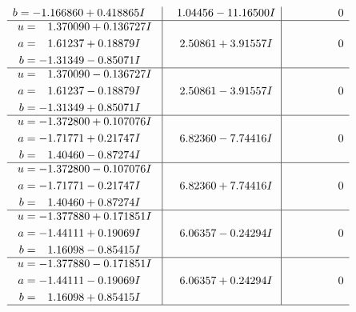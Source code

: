 \documentclass[1p]{elsarticle_modified}
\theoremstyle{definition}
\begin{document}
$$\begin{array}{c|c|c}
\begin{aligned}
b &= -1.166860 + 0.418865 I\end{aligned}
 & \phantom{-}1.04456 - 11.16500 I & \phantom{-0.000000 } 0 \\ \hline\begin{aligned}
u &= \phantom{-}1.370090 + 0.136727 I \\
a &= \phantom{-}1.61237 + 0.18879 I \\
b &= -1.31349 - 0.85071 I\end{aligned}
 & \phantom{-}2.50861 + 3.91557 I & \phantom{-0.000000 } 0 \\ \hline\begin{aligned}
u &= \phantom{-}1.370090 - 0.136727 I \\
a &= \phantom{-}1.61237 - 0.18879 I \\
b &= -1.31349 + 0.85071 I\end{aligned}
 & \phantom{-}2.50861 - 3.91557 I & \phantom{-0.000000 } 0 \\ \hline\begin{aligned}
u &= -1.372800 + 0.107076 I \\
a &= -1.71771 + 0.21747 I \\
b &= \phantom{-}1.40460 - 0.87274 I\end{aligned}
 & \phantom{-}6.82360 - 7.74416 I & \phantom{-0.000000 } 0 \\ \hline\begin{aligned}
u &= -1.372800 - 0.107076 I \\
a &= -1.71771 - 0.21747 I \\
b &= \phantom{-}1.40460 + 0.87274 I\end{aligned}
 & \phantom{-}6.82360 + 7.74416 I & \phantom{-0.000000 } 0 \\ \hline\begin{aligned}
u &= -1.377880 + 0.171851 I \\
a &= -1.44111 + 0.19069 I \\
b &= \phantom{-}1.16098 - 0.85415 I\end{aligned}
 & \phantom{-}6.06357 - 0.24294 I & \phantom{-0.000000 } 0 \\ \hline\begin{aligned}
u &= -1.377880 - 0.171851 I \\
a &= -1.44111 - 0.19069 I \\
b &= \phantom{-}1.16098 + 0.85415 I\end{aligned}
 & \phantom{-}6.06357 + 0.24294 I & \phantom{-0.000000 } 0\\
 \hline 
 \end{array}$$\newpage$$\begin{array}{c|c|c}  

\end{array}$$
\end{document}
